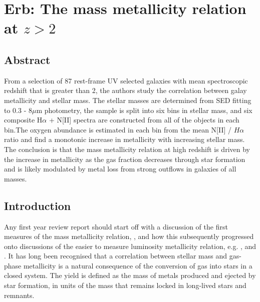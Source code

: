\documentclass{literature}
\begin{document}


\section{Erb: The mass metallicity relation at \texorpdfstring{$z > 2$}{z greater than 2}}\label{sec:erb}
\subsection{Abstract}
\citep{Erb_2006} From a selection of 87 rest-frame UV selected galaxies with mean spectroscopic redshift that is greater than 2, the authors study the correlation between galay metallicity and stellar mass. The stellar masses are determined from SED fitting to 0.3 - 8$\mu$m photometry, the sample is split into six bins in stellar mass, and six composite H$\alpha$ + N[II] spectra are constructed from all of the objects in each bin.The oxygen abundance is estimated in each bin from the mean N[II] / $H\alpha$ ratio and find a monotonic increase in metallicity with increasing stellar mass. The conclusion is that the mass metallicity relation at high redshift is driven by the increase in metallicity as the gas fraction decreases through star formation and is likely modulated by metal loss from strong outflows in galaxies of all masses.

\subsection{Introduction}
Any first year review report should start off with a discussion of the first measures of the mass metallicity relation, \citep{Lequeux1979}, and how this subsequently progressed onto discussions of the easier to measure luminosity metallicity relation, e.g. \citep{Zaritsky1994}, \citep{Skillman1989} and \citep{Salzer2005}. It has long been recognised that a correlation between stellar mass and gas-phase metallicity is a natural consequence of the conversion of gas into stars in a closed system. The yield is defined as the mass of metals produced and ejected by star formation, in units of the mass that remains locked in long-lived stars and remnants.
\end{document}
